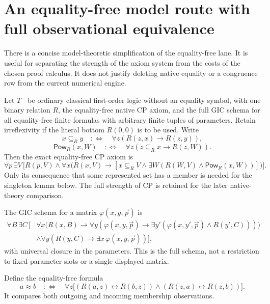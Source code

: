 \section{An equality-free model route with full observational equivalence}
\label{sec:ksequalityfree}

There is a concise model-theoretic simplification of the equality-free
lane. It is useful for separating the strength of the axiom system from
the costs of the chosen proof calculus. It does not justify deleting
native equality or a congruence row from the current numerical engine.

Let $T^-$ be ordinary classical first-order logic without an equality
symbol, with one binary relation $R$, the equality-free native CP axiom,
and the full GIC schema for all equality-free finite formulas with
arbitrary finite tuples of parameters. Retain irreflexivity if the
literal bottom $R(0,0)$ is to be used. Write
\[
 x\subseteq_R y\quad:\Longleftrightarrow\quad
 \forall z(R(z,x)\to R(z,y)),
\]
\[
 \mathsf{Pow}_R(x,W)\quad:\Longleftrightarrow\quad
 \forall z(z\subseteq_R x\to R(z,W)).
\]
Then the exact equality-free CP axiom is
\[
 \forall p\,\exists V\,\bigl[
 R(p,V)\land\forall x\bigl(R(x,V)\to
 [x\subseteq_R V\land\exists W(R(W,V)\land\mathsf{Pow}_R(x,W))]\bigr)\bigr].
\]
Only its consequence that some represented set has a member is needed
for the singleton lemma below. The full strength of CP is retained for
the later native-theory comparison.

The GIC schema for a matrix $\varphi(x,y,\vec p)$ is
\begin{align*}
 \forall B\,\exists C\,\bigl[&
 \forall x\bigl(R(x,B)\to
   \forall y(\varphi(x,y,\vec p)\to
    \exists y'(\varphi(x,y',\vec p)\land R(y',C)))\bigr)\\
 &\land\forall y(R(y,C)\to\exists x\,\varphi(x,y,\vec p))\bigr],
\end{align*}
with universal closure in the parameters. This is the full schema,
not a restriction to fixed parameter slots or a single displayed matrix.

Define the equality-free formula
\[
 a\approx b\quad:\Longleftrightarrow\quad
 \forall z\bigl[(R(a,z)\leftrightarrow R(b,z))\land
                (R(z,a)\leftrightarrow R(z,b))\bigr].
\]
It compares both outgoing and incoming membership observations.

